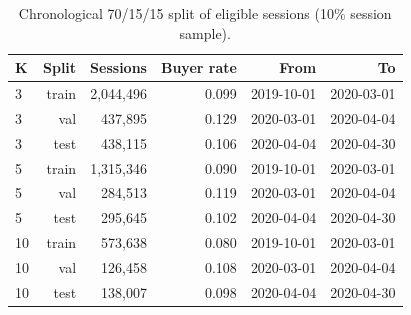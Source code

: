\begin{table}[t]
\centering
\caption{Chronological 70/15/15 split of eligible sessions (10\% session sample).}
\label{tab:data}
\footnotesize
\begin{tabular}{lrrrrr}
\toprule
K & Split & Sessions & Buyer rate & From & To \\
\midrule
3 & train & 2,044,496 & 0.099 & 2019-10-01 & 2020-03-01 \\
3 & val & 437,895 & 0.129 & 2020-03-01 & 2020-04-04 \\
3 & test & 438,115 & 0.106 & 2020-04-04 & 2020-04-30 \\
5 & train & 1,315,346 & 0.090 & 2019-10-01 & 2020-03-01 \\
5 & val & 284,513 & 0.119 & 2020-03-01 & 2020-04-04 \\
5 & test & 295,645 & 0.102 & 2020-04-04 & 2020-04-30 \\
10 & train & 573,638 & 0.080 & 2019-10-01 & 2020-03-01 \\
10 & val & 126,458 & 0.108 & 2020-03-01 & 2020-04-04 \\
10 & test & 138,007 & 0.098 & 2020-04-04 & 2020-04-30 \\
\bottomrule
\end{tabular}
\end{table}
